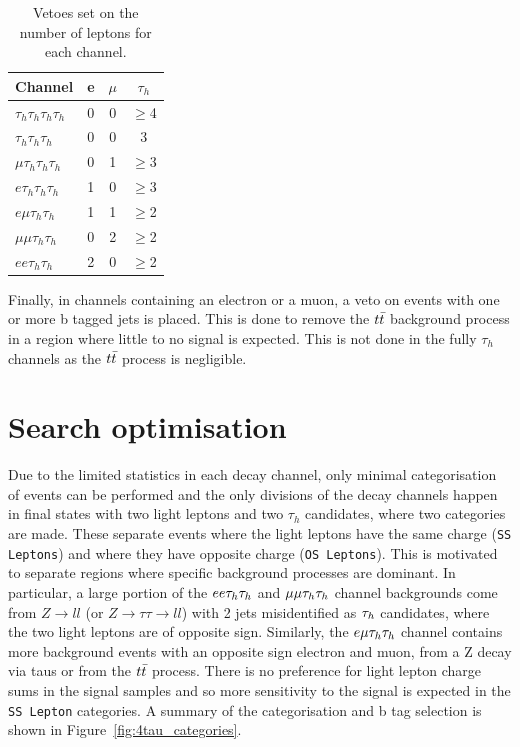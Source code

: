 \begin{table}[H]
   \centering
   \begin{tabular}{|l|c|c|c|}
   \hline
   \multicolumn{1}{|c|}{Channel} & e & $\mu$ & $\tau_h$ \\ \hline \hline
   $\tau_h \tau_h \tau_h \tau_h$ & 0 & 0     & $\geq$4        \\
   $\tau_h \tau_h \tau_h$        & 0 & 0     & 3        \\ 
   $\mu \tau_h \tau_h \tau_h$    & 0 & 1     & $\geq$3        \\
   $e \tau_h \tau_h \tau_h$      & 1 & 0     & $\geq$3        \\
   $e \mu \tau_h \tau_h$         & 1 & 1     & $\geq$2        \\
   $\mu \mu \tau_h \tau_h$       & 0 & 2     & $\geq$2        \\
   $e e \tau_h \tau_h$           & 2 & 0     & $\geq$2        \\ \hline
   \end{tabular}
   \caption{Vetoes set on the number of leptons for each channel.}
   \label{tab:leptonvetoes}
\end{table}

Finally, in channels containing an electron or a muon, a veto on events with one or more b tagged jets is placed.
This is done to remove the $t\bar{t}$ background process in a region where little to no signal is expected.
This is not done in the fully $\tau_h$ channels as the $t\bar{t}$ process is negligible. \\

\section{Search optimisation}

Due to the limited statistics in each decay channel, only minimal categorisation of events can be performed and the only divisions of the decay channels happen in final states with two light leptons and two $\tau_h$ candidates, where two categories are made.
These separate events where the light leptons have the same charge (\texttt{SS Leptons}) and where they have opposite charge (\texttt{OS Leptons}).
This is motivated to separate regions where specific background processes are dominant.
In particular, a large portion of the $ee\tau_{h}\tau_{h}$ and $\mu\mu\tau_{h}\tau_{h}$ channel backgrounds come from $Z\rightarrow ll$ (or $Z\rightarrow\tau\tau\rightarrow ll$) with 2 jets misidentified as $\tau_{h}$ candidates, where the two light leptons are of opposite sign.
Similarly, the $e\mu\tau_{h}\tau_{h}$ channel contains more background events with an opposite sign electron and muon, from a Z decay via taus or from the $t\bar{t}$ process.
There is no preference for light lepton charge sums in the signal samples and so more sensitivity to the signal is expected in the \texttt{SS Lepton} categories. 
A summary of the categorisation and b tag selection is shown in Figure~\ref{fig:4tau_categories}. \\

